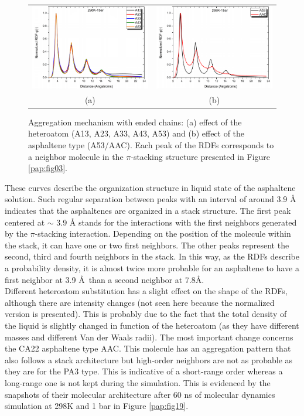 \begin{figure}[h]
	\begin{tabular}{cc}
		\includegraphics[width=0.45\columnwidth]{image/02a} & 	
		\includegraphics[width=0.45\columnwidth]{image/02b} \\
		(a) & (b) \\
	\end{tabular}
	\caption{Aggregation mechanism with  ended chains: (a) effect of the heteroatom (A13, A23, A33, A43, A53)  and (b) effect of the asphaltene type (A53/AAC). Each peak of the RDFs corresponds to a neighbor molecule in the $\pi$-stacking structure presented in Figure \ref{pap:fig03}.}
	\label{pap:fig18}
\end{figure}

These curves describe the organization structure in liquid state of the asphaltene solution. Such regular separation between peaks with an interval of around 3.9 \textup{\AA} indicates that the asphaltenes are organized in a stack structure. The first peak centered at $\sim$ 3.9 \textup{\AA} stands for the interactions with the first neighbors generated by the $\pi$-stacking interaction. Depending on the position of the molecule within the stack, it can have one or two first neighbors. The other peaks represent the second, third and fourth neighbors in the stack. In this way, as the RDFs describe a probability density, it is almost twice more probable for an asphaltene to have a first neighbor at 3.9 \AA~than a second neighbor at 7.8\AA.\\ 

Different heteroatom substitution has a slight effect on the shape of the RDFs, although there are intensity changes (not seen here because the normalized version is presented). This is probably due to the fact that the total density of the liquid is slightly changed in function of the heteroatom (as they have different masses and different Van der Waals radii). The most important change concerns the CA22 asphaltene type AAC. This molecule has an aggregation pattern that also follows a stack architecture but high-order neighbors are not as probable as they are for the PA3 type. This is indicative of a short-range order whereas a long-range one is not kept during the simulation. This is evidenced by the snapshots of their molecular architecture after 60 ns of molecular dynamics simulation at 298K and 1 bar in Figure \ref{pap:fig19}.

